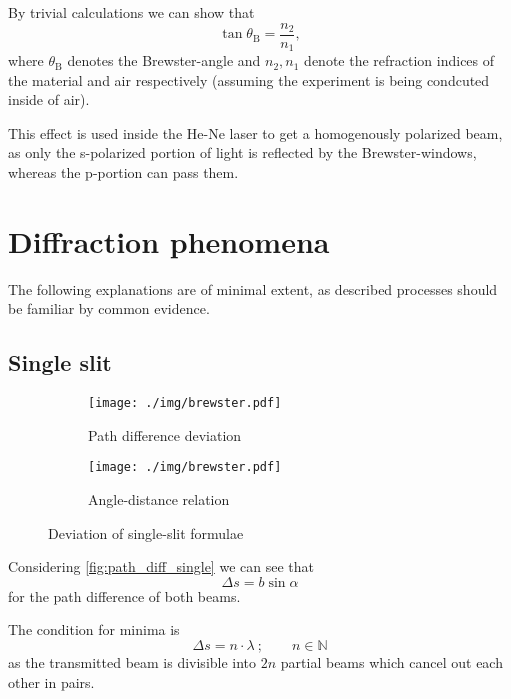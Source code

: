 By trivial calculations we can show that
\begin{equation}\label{eq:brewster}
	\tan\theta_\text{B}=\frac{n_2}{n_1},
\end{equation}
where $\theta_\text{B}$ denotes the Brewster-angle and $n_2, n_1$ denote the refraction indices of the material and air respectively (assuming the experiment is being condcuted inside of air).

This effect is used inside the He-Ne laser to get a homogenously polarized beam, as only the s-polarized portion of light is reflected by the Brewster-windows, whereas the p-portion can pass them.

\section{Diffraction phenomena}
The following explanations are of minimal extent, as described processes should be familiar by common evidence.

\subsection{Single slit}\label{subsec:single_slit}

\begin{figure}[tb]
	\begin{subfigure}{.51\textwidth}
		\centering
		\texttt{[image: ./img/brewster.pdf]}
		\caption[Single slit I]{Path difference deviation}
		\label{fig:path_diff_single}
	\end{subfigure}
	\begin{subfigure}{.51\textwidth}
		\centering
		\texttt{[image: ./img/brewster.pdf]}
		\caption[Single slit II]{Angle-distance relation}
		\label{fig:angle_distance_single}
	\end{subfigure}
	\caption[Deviation of single-slit formulae]{Deviation of single-slit formulae}
\end{figure}

Considering \autoref{fig:path_diff_single} we can see that
\begin{equation*}
	\Delta s=b\sin\alpha
\end{equation*}
for the path difference of both beams.

The condition for minima is
\begin{equation}\label{eq:path_diff_min}
	\Delta s = n\cdot\lambda\ ;\qquad n\in\mathbb{N}
\end{equation}
as the transmitted beam is divisible into $2n$ partial beams which cancel out each other in pairs.

